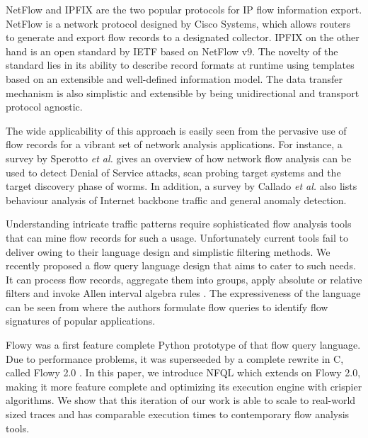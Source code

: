 NetFlow and \ac{IPFIX} are the two popular protocols for IP flow information
export. NetFlow \cite{rfc3954} is a network protocol designed by Cisco
Systems, which allows routers to generate and export flow records to a
designated collector. \ac{IPFIX} \cite{rfc5101} on the other hand is an open
standard by IETF based on NetFlow v$9$. The novelty of the standard lies in
its ability to describe record formats at runtime using templates based on an
extensible and well-defined information model. The data transfer mechanism is
also simplistic and extensible by being unidirectional and transport protocol
agnostic.

The wide applicability of this approach is easily seen from the pervasive use
of flow records for a vibrant set of network analysis applications. For
instance, a survey by Sperotto \textit{et al.} \cite{sperotto:2010} gives an
overview of how network flow analysis can be used to detect Denial of Service
attacks, scan probing target systems and the target discovery phase of worms.
In addition, a survey by Callado \textit{et al.} \cite{callado:2009} also
lists behaviour analysis of Internet backbone traffic and general anomaly
detection.

Understanding intricate traffic patterns require sophisticated flow analysis
tools that can mine flow records for such a usage.  Unfortunately current
tools fail to deliver owing to their language design and simplistic filtering
methods.  We recently proposed a flow query language design
\cite{vmarinov:2009} that aims to cater to such needs.  It can process
flow records, aggregate them into groups, apply absolute or relative filters
and invoke Allen interval algebra rules \cite{fallen:1983}. The expressiveness
of the language can be seen from \cite{vperelman:2011} where the authors
formulate flow queries to identify flow signatures of popular applications.

Flowy \cite{kkanev:2010} was a first feature complete Python prototype of that
flow query language. Due to performance problems, it was superseeded by a
complete rewrite in C, called Flowy 2.0 \cite{jschauer:thesis:2011}. In this
paper, we introduce \ac{NFQL} which extends on Flowy 2.0, making it more
feature complete and optimizing its execution engine with crispier algorithms.
We show that this iteration of our work is able to scale to real-world sized
traces and has comparable execution times to contemporary flow analysis tools.

